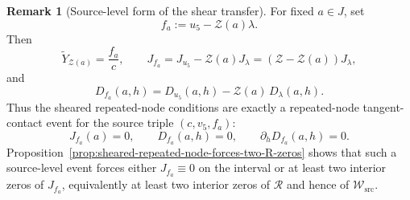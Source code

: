 \documentclass[11pt,a4paper]{amsart}
\theoremstyle{plain}
\theoremstyle{definition}
\newtheorem{remark}[theorem]{Remark}
\begin{document}
\begin{remark}[Source-level form of the shear transfer]
\label{rem:source-level-form-of-shear-transfer}
For fixed $a\in J$, set
\[
f_a:=u_5-\mathcal Z(a)\lambda.
\]
Then
\[
\widetilde Y_{\mathcal Z(a)}=\frac{f_a}{c},
\qquad
J_{f_a}=J_{u_5}-\mathcal Z(a)J_\lambda
=(\mathcal Z-\mathcal Z(a))J_\lambda,
\]
and
\[
D_{f_a}(a,h)=D_{u_5}(a,h)-\mathcal Z(a)\,D_\lambda(a,h).
\]
Thus the sheared repeated-node conditions are exactly a repeated-node
tangent-contact event for the source triple $(c,v_5,f_a)$:
\[
J_{f_a}(a)=0,
\qquad
D_{f_a}(a,h)=0,
\qquad
\partial_h D_{f_a}(a,h)=0.
\]
Proposition~\ref{prop:sheared-repeated-node-forces-two-R-zeros} shows that such
a source-level event forces either $J_{f_a}\equiv 0$ on the interval or at least
two interior zeros of $J_{f_a}$, equivalently at least two interior zeros of
$\mathcal R$ and hence of $\mathcal W_{\mathrm{src}}$.
\end{remark}
\end{document}

